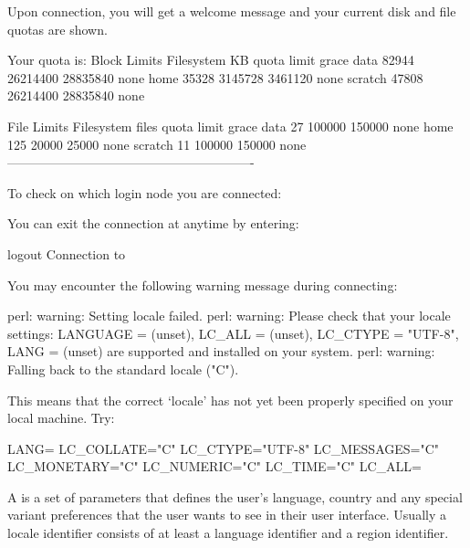 Upon connection, you will get a welcome message and your current disk and file quotas are shown.

\begin{prompt}
Your quota is:
Block Limits
   Filesystem         KB      quota      limit    grace
   data            82944   26214400   28835840     none
   home            35328    3145728    3461120     none
   scratch         47808   26214400   28835840     none

File Limits
   Filesystem      files      quota      limit    grace
   data               27     100000     150000     none
   home              125      20000      25000     none
   scratch            11     100000     150000     none
----------------------------------------------------------
\end{prompt}

To check on which login node you are connected:

\begin{prompt}
\end{prompt}

You can exit the connection at anytime by entering:

\begin{prompt}
logout
Connection to %
\end{prompt}


You may encounter the following warning message during connecting:
\begin{prompt}
perl: warning: Setting locale failed.
perl: warning: Please check that your locale settings:
LANGUAGE = (unset),
LC_ALL = (unset),
LC_CTYPE = "UTF-8",
LANG = (unset)
    are supported and installed on your system.
perl: warning: Falling back to the standard locale ("C").
\end{prompt}

This means that the correct `locale' has not yet been properly specified on your local machine. Try:

\begin{prompt}
LANG=
LC_COLLATE="C"
LC_CTYPE="UTF-8"
LC_MESSAGES="C"
LC_MONETARY="C"
LC_NUMERIC="C"
LC_TIME="C"
LC_ALL=
\end{prompt}

A  is a set of parameters that defines the user's language,
country and any special variant preferences that the user wants to see in their
user interface. Usually a locale identifier consists of at least a language
identifier and a region identifier.

